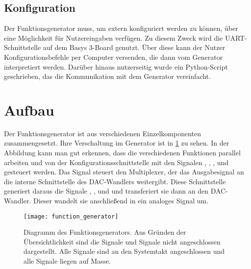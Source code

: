 \subsection{Konfiguration}
Der Funktionsgenerator muss, um extern konfiguriert werden zu können, über eine Möglichkeit für Nutzereingaben verfügen.
Zu diesem Zweck wird die UART-Schnittstelle auf dem Basys 3-Board genutzt.
Über diese kann der Nutzer Konfigurationsbefehle per Computer versenden, die dann vom Generator interpretiert werden.
Darüber hinaus nutzerseitig wurde ein Python-Script geschrieben, das die Kommunikation mit dem Generator vereinfacht.

\section{Aufbau}
Der Funktionsgenerator ist aus verschiedenen Einzelkomponenten zusammengesetzt.
Ihre Verschaltung im Generator ist in \cref{Concept:FuncGenDia} zu sehen.
In der Abbildung kann man gut erkennen, dass die verschiedenen Funktionen parallel arbeiten und von der Konfigurationsschnittstelle mit den Signalen , , ,  und  gesteuert werden.
Das Signal  steuert den Multiplexer, der das Ausgabesignal  an die interne Schnittstelle des DAC-Wandlers weitergibt.
Diese Schnittstelle generiert daraus die Signale , ,  und  und transferiert sie dann an den DAC-Wandler.
Dieser wandelt sie anschließend in ein analoges Signal um.

\begin{figure}[h] \centering
  \texttt{[image: function\_generator]}
  \caption{Diagramm des Funktionsgenerators. Aus Gründen der Übersichtlichkeit sind die  Signale und  Signale nicht angeschlossen dargestellt. Alle  Signale sind an den Systemtakt angeschlossen und alle  Signale liegen auf Masse.}  \label{Concept:FuncGenDia}
\end{figure}

